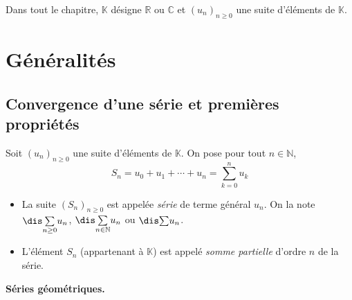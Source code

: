 \documentclass[french,11pt,twoside]{VcCours}
\newcommand{\Sum}[2]{\ensuremath{\textstyle{\sum\limits_{#1}^{#2}}}}
\begin{document}

\tableofcontents
\separationTitre

\newpage
Dans tout le chapitre, $\mathbb{K}$ désigne $\mathbb{R}$ ou $\mathbb{C}$ et $(u_n)_{n \geq 0}$ une suite d'éléments de $\mathbb{K}$.

\section{Généralités}
\subsection{Convergence d'une série et premières propriétés}
\begin{defin}
Soit $(u_n)_{n \geq 0}$ une suite d'éléments de $\mathbb{K}$. On pose pour tout $n \in \mathbb{N}$,
$$ S_n =  u_0 + u_1 + \cdots + u_n = \sum_{k=0}^n u_k $$

\begin{itemize}
\item La suite $(S_n)_{n \geq 0}$ est appelée \textit{série} de terme général $u_n$. On la note $\dis \Sum{n \geq 0}{} u_n$, $\dis \Sum{n \in \mathbb{N}}{} u_n$ ou $\dis \Sum{}{} u_n$.
\item L'élément $S_n$ (appartenant à $\mathbb{K}$) est appelé \textit{somme partielle} d'ordre $n$ de la série.
\end{itemize}
\end{defin}

\begin{ex} \textbf{Séries géométriques.}

%
%

\vspace{5cm}
\end{ex}
\end{document}
